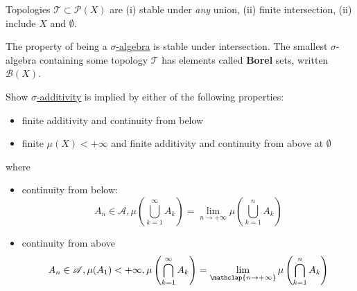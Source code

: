 \documentclass[twoside]{article}
\newcommand{\powerset}{\mathscr{P}}
\begin{document}
\begin{remark}
    Topologies $\mathscr{T} \subset \powerset(X)$ are (i) stable under \textit{any} union, (ii) finite intersection, (ii) include $X$ and $\emptyset$.
\end{remark}

\begin{remark}
    The property of being a \hyperlink{def:sigAlg}{$\sigma$-algebra} is stable under intersection.
    The smallest $\sigma$-algebra containing some topology $\mathscr{T}$ has elements called \hypertarget{def:borelSet}{\textbf{Borel} sets}, written $\mathcal{B}(X)$.
\end{remark}


\begin{ex}
    Show \hyperlink{def:sigAdd}{$\sigma$-additivity} is implied by either of the following properties:
    \begin{itemize}
        \item finite additivity and continuity from below
        \item finite $\mu(X) < +\infty$ and finite additivity and continuity from above at $\emptyset$
    \end{itemize}
    where
    \begin{itemize}
        \item continuity from below:
            \begin{equation*}
                A_n \in \mathscr{A}, \mu\left(\bigcup_{k=1}^\infty A_k\right)  = \lim_{n \to +\infty} \mu\left(\bigcup_{k=1}^n A_k\right)
            \end{equation*}
        \item continuity from above
            \begin{equation*}
                A_n \in \mathscr{A}, \mu(A_1) < +\infty, \mu\left(\bigcap_{k=1}^\infty A_k\right)  = \lim_{\mathclap{n \to +\infty}} \mu\left(\bigcap_{k=1}^n A_k\right)
            \end{equation*}
    \end{itemize}
\end{ex}
\end{document}
